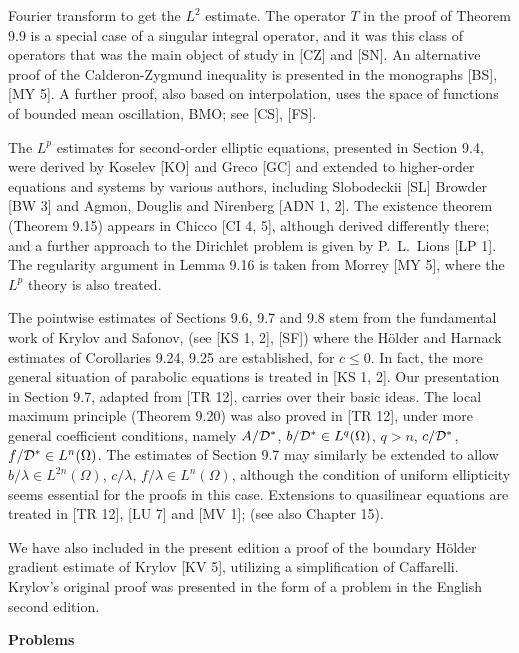 
Fourier transform to get the $L^2$ estimate. The operator $T$ in the proof of Theorem
9.9 is a special case of a singular integral operator, and it was this class of operators
that was the main object of study in [CZ] and [SN]. An alternative proof of the
Calderon-Zygmund inequality is presented in the monographs [BS], [MY 5]. A
further proof, also based on interpolation, uses the space of functions of bounded
mean oscillation, BMO; see [CS], [FS].

The $L^p$ estimates for second-order elliptic equations, presented in Section 9.4,
were derived by Koselev [KO] and Greco [GC] and extended to higher-order
equations and systems by various authors, including Slobodeckii [SL] Browder
[BW 3] and Agmon, Douglis and Nirenberg [ADN 1, 2]. The existence theorem
(Theorem 9.15) appears in Chicco [CI 4, 5], although derived differently there; and
a further approach to the Dirichlet problem is given by P.\ L.\ Lions [LP 1]. The
regularity argument in Lemma 9.16 is taken from Morrey [MY 5], where the $L^p$
theory is also treated.

The pointwise estimates of Sections 9.6, 9.7 and 9.8 stem from the fundamental
work of Krylov and Safonov, (see [KS 1, 2], [SF]) where the H\"older and Harnack
estimates of Corollaries 9.24, 9.25 are established, for $c \le 0$. In fact, the more
general situation of parabolic equations is treated in [KS 1, 2]. Our presentation in
Section 9.7, adapted from [TR 12], carries over their basic ideas. The local maximum
principle (Theorem 9.20) was also proved in [TR 12], under more general coefficient
conditions, namely $A/\mathcal{D}^*$, $b/\mathcal{D}^* \in L^q(\Omega)$, $q > n$, $c/\mathcal{D}^*$, $f/\mathcal{D}^* \in L^n(\Omega)$. The estimates
of Section 9.7 may similarly be extended to allow $b/\lambda \in L^{2n}(\Omega)$, $c/\lambda$, $f/\lambda \in L^n(\Omega)$,
although the condition of uniform ellipticity seems essential for the proofs in this
case. Extensions to quasilinear equations are treated in [TR 12], [LU 7] and [MV 1];
(see also Chapter 15).

We have also included in the present edition a proof of the boundary H\"older
gradient estimate of Krylov [KV 5], utilizing a simplification of Caffarelli. Krylov's
original proof was presented in the form of a problem in the English second
edition.

\bigskip

\noindent\textbf{Problems}

\medskip

